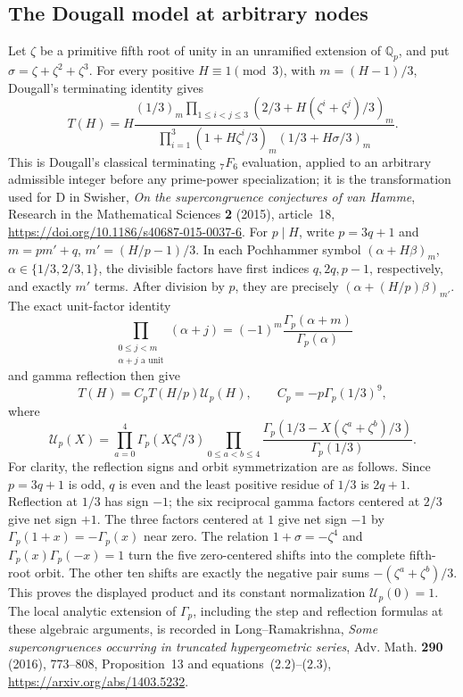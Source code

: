 \documentclass[11pt,letterpaper]{article}
\numberwithin{equation}{section}
\begin{document}
\subsection{The Dougall model at arbitrary nodes}
Let $\zeta$ be a primitive fifth root of unity in an unramified
extension of $\mathbb Q_p$, and put $\sigma=\zeta+\zeta^2+\zeta^3$.
For every positive $H\equiv1\pmod3$, with $m=(H-1)/3$, Dougall's
terminating identity gives
\begin{equation}\label{V-eq:d-arbitrary-dougall}
 T(H)=H\frac{(1/3)_m
 \prod_{1\le i<j\le3}(2/3+H(\zeta^i+\zeta^j)/3)_m}
 {\prod_{i=1}^3(1+H\zeta^i/3)_m
 (1/3+H\sigma/3)_m}.
\end{equation}
This is Dougall's classical terminating ${}_7F_6$ evaluation, applied
to an arbitrary admissible integer before any prime-power
specialization; it is the transformation used for D in Swisher,
\emph{On the supercongruence conjectures of van Hamme},
Research in the Mathematical Sciences \textbf{2} (2015), article~18,
\url{https://doi.org/10.1186/s40687-015-0037-6}.
For $p\mid H$, write $p=3q+1$ and
$m=pm'+q$, $m'=(H/p-1)/3$. In each Pochhammer symbol
$(\alpha+H\beta)_m$, $\alpha\in\{1/3,2/3,1\}$, the divisible factors
have first indices $q,2q,p-1$, respectively, and exactly $m'$ terms.
After division by $p$, they are precisely
$(\alpha+(H/p)\beta)_{m'}$. The exact unit-factor identity
\[
\prod_{\substack{0\le j<m\\\alpha+j\text{ a unit}}}(\alpha+j)
=(-1)^m\frac{\Gamma_p(\alpha+m)}{\Gamma_p(\alpha)}
\]
and gamma reflection then give
\begin{equation}\label{V-eq:d-arbitrary-model-step}
 T(H)=C_pT(H/p)\mathcal U_p(H),\qquad
 C_p=-p\Gamma_p(1/3)^9,
\end{equation}
where
\[
 \mathcal U_p(X)=
 \prod_{a=0}^4\Gamma_p(X\zeta^a/3)
 \prod_{0\le a<b\le4}
 \frac{\Gamma_p(1/3-X(\zeta^a+\zeta^b)/3)}{\Gamma_p(1/3)}.
\]
For clarity, the reflection signs and orbit symmetrization are as
follows. Since $p=3q+1$ is odd, $q$ is even and the least positive
residue of $1/3$ is $2q+1$. Reflection at $1/3$ has sign $-1$;
the six reciprocal gamma factors centered at $2/3$ give net sign
$+1$. The three factors centered at $1$ give net sign $-1$ by
$\Gamma_p(1+x)=-\Gamma_p(x)$ near zero. The relation
$1+\sigma=-\zeta^4$ and $\Gamma_p(x)\Gamma_p(-x)=1$ turn the
five zero-centered shifts into the complete fifth-root orbit.
The other ten shifts are exactly the negative pair sums
$-(\zeta^a+\zeta^b)/3$. This proves the displayed product and its
constant normalization $\mathcal U_p(0)=1$.
The local analytic extension of $\Gamma_p$, including the step and
reflection formulas at these algebraic arguments, is recorded in
Long--Ramakrishna, \emph{Some supercongruences occurring in truncated
hypergeometric series}, Adv. Math. \textbf{290} (2016), 773--808,
Proposition~13 and equations~(2.2)--(2.3),
\url{https://arxiv.org/abs/1403.5232}.
\end{document}
